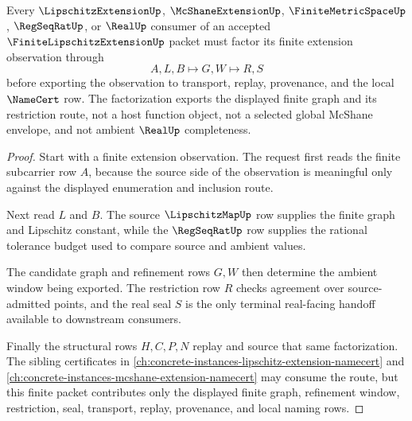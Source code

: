 \begin{theorem}
\label{thm:finite-lipschitz-extension-window-factorization}
Every $\LipschitzExtensionUp$, $\McShaneExtensionUp$, $\FiniteMetricSpaceUp$, $\RegSeqRatUp$, or $\RealUp$ consumer of an accepted $\FiniteLipschitzExtensionUp$ packet must factor its finite extension observation through
$$
A,L,B \longmapsto G,W \longmapsto R,S
$$
before exporting the observation to transport, replay, provenance, and the local $\NameCert$ row. The factorization exports the displayed finite graph and its restriction route, not a host function object, not a selected global McShane envelope, and not ambient $\RealUp$ completeness.
\end{theorem}
\begin{proof}
Start with a finite extension observation. The request first reads the finite subcarrier row $A$, because the source side of the observation is meaningful only against the displayed enumeration and inclusion route.

Next read $L$ and $B$. The source $\LipschitzMapUp$ row supplies the finite graph and Lipschitz constant, while the $\RegSeqRatUp$ row supplies the rational tolerance budget used to compare source and ambient values.

The candidate graph and refinement rows $G,W$ then determine the ambient window being exported. The restriction row $R$ checks agreement over source-admitted points, and the real seal $S$ is the only terminal real-facing handoff available to downstream consumers.

Finally the structural rows $H,C,P,N$ replay and source that same factorization. The sibling certificates in \autoref{ch:concrete-instances-lipschitz-extension-namecert} and \autoref{ch:concrete-instances-mcshane-extension-namecert} may consume the route, but this finite packet contributes only the displayed finite graph, refinement window, restriction, seal, transport, replay, provenance, and local naming rows.
\end{proof}



